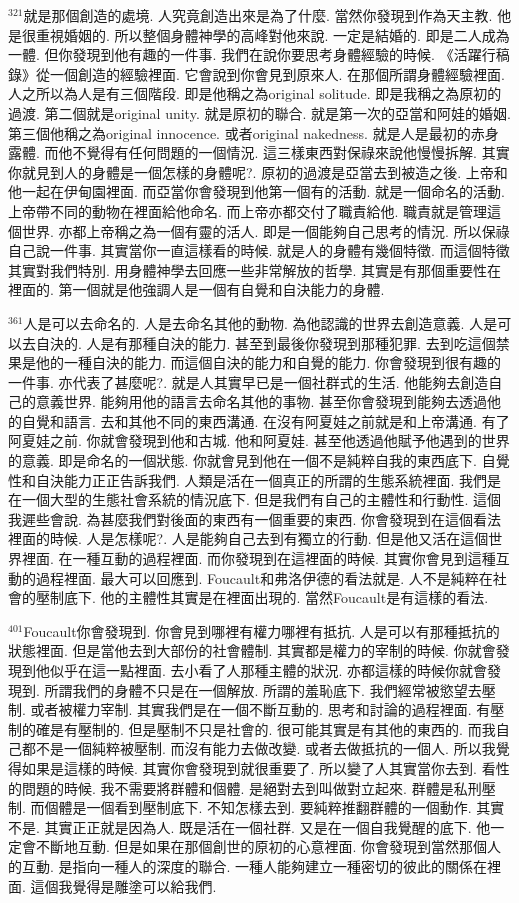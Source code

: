 \documentclass{book}
\begin{document}
$^{321}$就是那個創造的處境.
人究竟創造出來是為了什麼.
當然你發現到作為天主教.
他是很重視婚姻的.
所以整個身體神學的高峰對他來說.
一定是結婚的.
即是二人成為一體.
但你發現到他有趣的一件事.
我們在說你要思考身體經驗的時候.
《活躍行稿錄》從一個創造的經驗裡面.
它會說到你會見到原來人.
在那個所謂身體經驗裡面.
人之所以為人是有三個階段.
即是他稱之為original solitude.
即是我稱之為原初的過渡.
第二個就是original unity.
就是原初的聯合.
就是第一次的亞當和阿娃的婚姻.
第三個他稱之為original innocence.
或者original nakedness.
就是人是最初的赤身露體.
而他不覺得有任何問題的一個情況.
這三樣東西對保祿來說他慢慢拆解.
其實你就見到人的身體是一個怎樣的身體呢?.
原初的過渡是亞當去到被造之後.
上帝和他一起在伊甸園裡面.
而亞當你會發現到他第一個有的活動.
就是一個命名的活動.
上帝帶不同的動物在裡面給他命名.
而上帝亦都交付了職責給他.
職責就是管理這個世界.
亦都上帝稱之為一個有靈的活人.
即是一個能夠自己思考的情況.
所以保祿自己說一件事.
其實當你一直這樣看的時候.
就是人的身體有幾個特徵.
而這個特徵其實對我們特別.
用身體神學去回應一些非常解放的哲學.
其實是有那個重要性在裡面的.
第一個就是他強調人是一個有自覺和自決能力的身體.

$^{361}$人是可以去命名的.
人是去命名其他的動物.
為他認識的世界去創造意義.
人是可以去自決的.
人是有那種自決的能力.
甚至到最後你發現到那種犯罪.
去到吃這個禁果是他的一種自決的能力.
而這個自決的能力和自覺的能力.
你會發現到很有趣的一件事.
亦代表了甚麼呢?.
就是人其實早已是一個社群式的生活.
他能夠去創造自己的意義世界.
能夠用他的語言去命名其他的事物.
甚至你會發現到能夠去透過他的自覺和語言.
去和其他不同的東西溝通.
在沒有阿夏娃之前就是和上帝溝通.
有了阿夏娃之前.
你就會發現到他和古城.
他和阿夏娃.
甚至他透過他賦予他遇到的世界的意義.
即是命名的一個狀態.
你就會見到他在一個不是純粹自我的東西底下.
自覺性和自決能力正正告訴我們.
人類是活在一個真正的所謂的生態系統裡面.
我們是在一個大型的生態社會系統的情況底下.
但是我們有自己的主體性和行動性.
這個我遲些會說.
為甚麼我們對後面的東西有一個重要的東西.
你會發現到在這個看法裡面的時候.
人是怎樣呢?.
人是能夠自己去到有獨立的行動.
但是他又活在這個世界裡面.
在一種互動的過程裡面.
而你發現到在這裡面的時候.
其實你會見到這種互動的過程裡面.
最大可以回應到.
Foucault和弗洛伊德的看法就是.
人不是純粹在社會的壓制底下.
他的主體性其實是在裡面出現的.
當然Foucault是有這樣的看法.

$^{401}$Foucault你會發現到.
你會見到哪裡有權力哪裡有抵抗.
人是可以有那種抵抗的狀態裡面.
但是當他去到大部份的社會體制.
其實都是權力的宰制的時候.
你就會發現到他似乎在這一點裡面.
去小看了人那種主體的狀況.
亦都這樣的時候你就會發現到.
所謂我們的身體不只是在一個解放.
所謂的羞恥底下.
我們經常被慾望去壓制.
或者被權力宰制.
其實我們是在一個不斷互動的.
思考和討論的過程裡面.
有壓制的確是有壓制的.
但是壓制不只是社會的.
很可能其實是有其他的東西的.
而我自己都不是一個純粹被壓制.
而沒有能力去做改變.
或者去做抵抗的一個人.
所以我覺得如果是這樣的時候.
其實你會發現到就很重要了.
所以變了人其實當你去到.
看性的問題的時候.
我不需要將群體和個體.
是絕對去到叫做對立起來.
群體是私刑壓制.
而個體是一個看到壓制底下.
不知怎樣去到.
要純粹推翻群體的一個動作.
其實不是.
其實正正就是因為人.
既是活在一個社群.
又是在一個自我覺醒的底下.
他一定會不斷地互動.
但是如果在那個創世的原初的心意裡面.
你會發現到當然那個人的互動.
是指向一種人的深度的聯合.
一種人能夠建立一種密切的彼此的關係在裡面.
這個我覺得是雕塗可以給我們.
\end{document}
